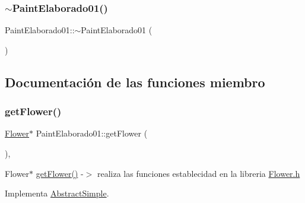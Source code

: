 \mbox{\label{class_paint_elaborado01_acb3937eeb7962dabab4add6d670c3a72}} 
\subsubsection{\texorpdfstring{$\sim$PaintElaborado01()}{~PaintElaborado01()}}
{\footnotesize\ttfamily Paint\+Elaborado01\+::$\sim$\+Paint\+Elaborado01 (\begin{DoxyParamCaption}{ }\end{DoxyParamCaption})\hspace{0.3cm}{\ttfamily [inline]}}



\subsection{Documentación de las funciones miembro}
\mbox{\label{class_paint_elaborado01_af3cbb01b8c86f74467c83521548b6311}} 
\subsubsection{\texorpdfstring{getFlower()}{getFlower()}}
{\footnotesize\ttfamily \mbox{\hyperlink{class_flower}{Flower}}$\ast$ Paint\+Elaborado01\+::get\+Flower (\begin{DoxyParamCaption}{ }\end{DoxyParamCaption})\hspace{0.3cm}{\ttfamily [inline]}, {\ttfamily [virtual]}}

Flower$\ast$ \mbox{\hyperlink{class_paint_elaborado01_af3cbb01b8c86f74467c83521548b6311}{get\+Flower()}} -\/$>$ realiza las funciones establecidad en la libreria \mbox{\hyperlink{_flower_8h}{Flower.\+h}} 

Implementa \mbox{\hyperlink{class_abstract_simple_a32da8b68a506bf223035acc62451724f}{Abstract\+Simple}}.

\mbox{\label{class_paint_elaborado01_a0c42906a02e9f8081521dd7706f63e0f}} 
